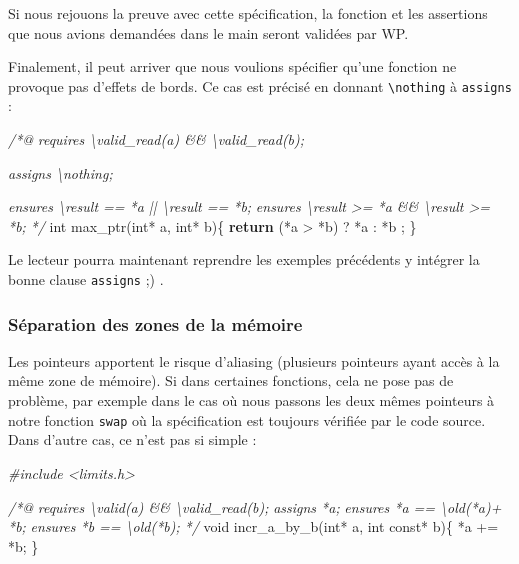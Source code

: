 \documentclass[12pt,francais,]{scrbook}
\newenvironment{Shaded}{}{}
\newcommand{\KeywordTok}[1]{\textcolor[rgb]{0.00,0.44,0.13}{\textbf{{#1}}}}
\newcommand{\DataTypeTok}[1]{\textcolor[rgb]{0.56,0.13,0.00}{{#1}}}
\newcommand{\CommentTok}[1]{\textcolor[rgb]{0.38,0.63,0.69}{\textit{{#1}}}}
\newcommand{\NormalTok}[1]{{#1}}
\begin{document}
Si nous rejouons la preuve avec cette spécification, la fonction et les
assertions que nous avions demandées dans le main seront validées par
WP.

Finalement, il peut arriver que nous voulions spécifier qu'une fonction
ne provoque pas d'effets de bords. Ce cas est précisé en donnant
\texttt{\textbackslash{}nothing} à \texttt{assigns} :

\begin{footnotesize}\begin{Shaded}
\begin{Highlighting}[]
\CommentTok{/*@}
\CommentTok{  requires \textbackslash{}valid_read(a) && \textbackslash{}valid_read(b);}

\CommentTok{  assigns  \textbackslash{}nothing;}

\CommentTok{  ensures \textbackslash{}result == *a || \textbackslash{}result == *b;}
\CommentTok{  ensures \textbackslash{}result >= *a && \textbackslash{}result >= *b;}
\CommentTok{*/}
\DataTypeTok{int} \NormalTok{max_ptr(}\DataTypeTok{int}\NormalTok{* a, }\DataTypeTok{int}\NormalTok{* b)\{}
  \KeywordTok{return} \NormalTok{(*a > *b) ? *a : *b ;}
\NormalTok{\}}
\end{Highlighting}
\end{Shaded}\end{footnotesize}

Le lecteur pourra maintenant reprendre les exemples précédents y
intégrer la bonne clause \texttt{assigns} ;) .

\subsubsection{Séparation des zones de la
mémoire}\label{suxe9paration-des-zones-de-la-muxe9moire}

Les pointeurs apportent le risque d'aliasing (plusieurs pointeurs ayant
accès à la même zone de mémoire). Si dans certaines fonctions, cela ne
pose pas de problème, par exemple dans le cas où nous passons les deux
mêmes pointeurs à notre fonction \texttt{swap} où la spécification est
toujours vérifiée par le code source. Dans d'autre cas, ce n'est pas si
simple :

\begin{footnotesize}\begin{Shaded}
\begin{Highlighting}[]
\CommentTok{#include <limits.h>}

\CommentTok{/*@}
\CommentTok{  requires \textbackslash{}valid(a) && \textbackslash{}valid_read(b);}
\CommentTok{  assigns  *a;}
\CommentTok{  ensures  *a == \textbackslash{}old(*a)+ *b;}
\CommentTok{  ensures  *b == \textbackslash{}old(*b);}
\CommentTok{*/}
\DataTypeTok{void} \NormalTok{incr_a_by_b(}\DataTypeTok{int}\NormalTok{* a, }\DataTypeTok{int} \DataTypeTok{const}\NormalTok{* b)\{}
  \NormalTok{*a += *b;}
\NormalTok{\}}
\end{Highlighting}
\end{Shaded}\end{footnotesize}
\end{document}
